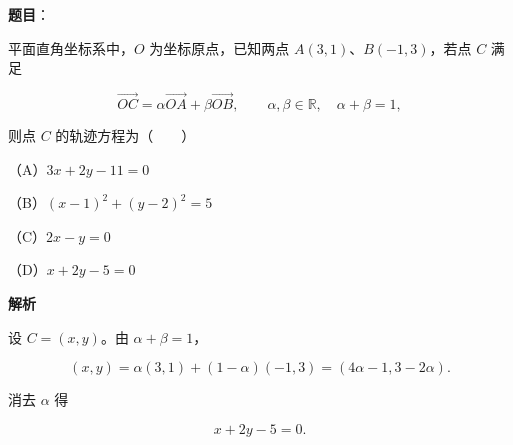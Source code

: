 \begin{answer}

\textbf{题目}：

平面直角坐标系中，$O$ 为坐标原点，已知两点 $A(3,1)\text{、}B(-1,3)$，若点 $C$ 满足

\nopagebreak[4]
\[
\overrightarrow{OC}=\alpha\overrightarrow{OA}+\beta\overrightarrow{OB},
\qquad \alpha,\beta\in\mathbb R,\quad \alpha+\beta=1,
\]

则点 $C$ 的轨迹方程为\mbox{（　　）}

（A）$3x+2y-11=0$

（B）$(x-1)^2+(y-2)^2=5$

（C）$2x-y=0$

（D）$x+2y-5=0$

\textbf{解析}

设 $C=(x,y)$。由 $\alpha+\beta=1$，

\nopagebreak[4]
\[
(x,y)=\alpha(3,1)+(1-\alpha)(-1,3)
=(4\alpha-1,3-2\alpha).
\]

消去 $\alpha$ 得

\nopagebreak[4]
\[
x+2y-5=0.
\]


\end{answer}

